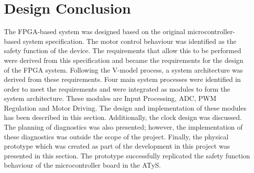 \section{Design Conclusion}

The FPGA-based system was designed based on the original microcontroller-based system specification. The motor control behaviour was identified as the safety function of the device. The requirements that allow this to be performed were derived from this specification and became the requirements for the design of the FPGA system. Following the V-model process, a system architecture was derived from these requirements. Four main system processes were identified in order to meet the requirements and were integrated as modules to form the system architecture. These modules are Input Processing, ADC, PWM Regulation and Motor Driving. The design and implementation of these modules has been described in this section. Additionally, the clock design was discussed. The planning of diagnostics was also presented; however, the implementation of these diagnostics was outside the scope of the project. Finally, the physical prototype which was created as part of the development in this project was presented in this section. The prototype successfully replicated the safety function behaviour of the microcontroller board in the ATyS.